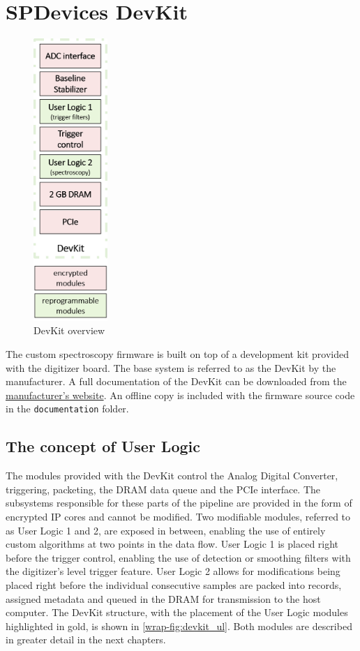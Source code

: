 \documentclass[a4paper,12pt,table]{article}
\begin{document}
\section{SPDevices DevKit}
	\begin{figure}
		\includegraphics[width=0.25\textwidth]{img/devkit_ul.png}
		\caption{DevKit overview}\label{wrap-fig:devkit_ul}
	\end{figure}
	The custom spectroscopy firmware is built on top of a development kit provided with the digitizer board.
	The base system is referred to as the DevKit by the manufacturer. 
	A full documentation of the DevKit can be downloaded from the 
	\href{https://www.spdevices.com/documents/user-guides/24-adq14-development-kit}{manufacturer's website}.
	An offline copy is included with the firmware source code in the \verb|documentation| folder.
	\subsection{The concept of User Logic}
		The modules provided with the DevKit control the Analog Digital Converter, triggering,
		packeting, the DRAM data queue and the PCIe interface. The subsystems responsible for these
		parts of the pipeline are provided in the form of encrypted IP cores and cannot be modified.
		Two modifiable modules, referred to as User Logic 1 and 2, are exposed in between,
		enabling the use of entirely custom algorithms at two points in the data flow.
		User Logic 1 is placed right before the trigger control, enabling the use of
		detection or smoothing filters with the digitizer's level trigger feature.
		User Logic 2 allows for modifications being placed right before the individual consecutive
		samples are packed into records, assigned metadata and queued in the DRAM for transmission to the
		host computer. The DevKit structure, with the placement of the User Logic modules highlighted in gold,
		is shown in \autoref{wrap-fig:devkit_ul}. 
		Both modules are described in greater detail in the next chapters.
		\par
		\newpage
\end{document}
